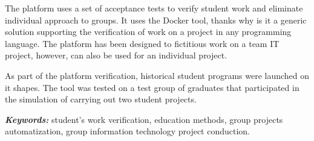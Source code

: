 The platform uses a set of acceptance tests to verify student work and eliminate individual approach to groups.
It uses the Docker tool, thanks why is it a generic solution supporting the verification of work on a project in any programming language.
The platform has been designed to fictitious work on a team IT project, however, can also be used for an individual project.

As part of the platform verification, historical student programs were launched on it shapes.
The tool was tested on a test group of graduates that participated in the simulation of carrying out two student projects. \newline

\textit{\textbf{Keywords:}} student's work verification, education methods, group projects automatization, group information technology project conduction.

\cleardoublepage
